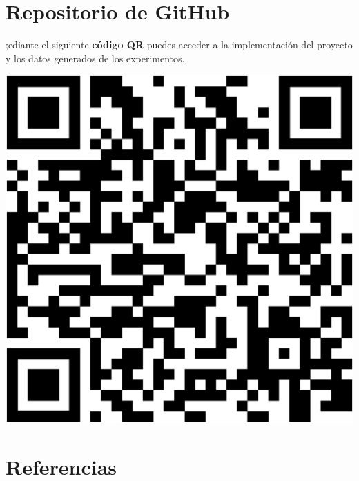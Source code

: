 \documentclass[a0,portrait]{a0poster}
\begin{document}
\begin{multicols}{3}
\section*{Repositorio de GitHub}
;ediante el siguiente \textbf{código QR} puedes acceder a la implementación del proyecto y los datos generados de los experimentos.
\vspace{2cm}
\begin{center}
    \includegraphics[scale=0.4]{repoqr.eps}
\end{center}

\section*{Referencias}

\nocite{adam_opt}

\renewcommand\refname{\vskip -1cm}




\end{multicols}
\end{document}
